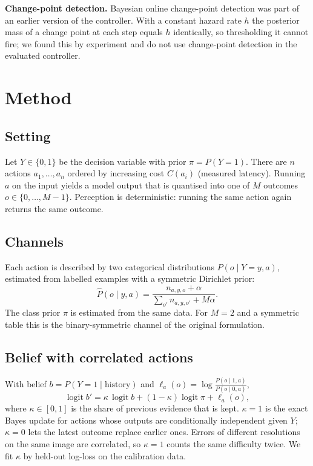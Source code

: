 \documentclass[11pt]{article}
\begin{document}
\textbf{Change-point detection.} Bayesian online change-point detection \cite{adams2007bayesian}
was part of an earlier version of the controller. With a constant hazard rate $h$ the posterior
mass of a change point at each step equals $h$ identically, so thresholding it cannot fire; we
found this by experiment and do not use change-point detection in the evaluated controller.

\section{Method}
\label{sec:method}

\subsection{Setting}
Let $Y\in\{0,1\}$ be the decision variable with prior $\pi=P(Y{=}1)$. There are $n$ actions
$a_1,\dots,a_n$ ordered by increasing cost $C(a_i)$ (measured latency). Running $a$ on the input
yields a model output that is quantised into one of $M$ outcomes $o\in\{0,\dots,M{-}1\}$. Perception
is deterministic: running the same action again returns the same outcome.

\subsection{Channels}
Each action is described by two categorical distributions $P(o\mid Y{=}y,a)$, estimated from
labelled examples with a symmetric Dirichlet prior:
\begin{equation}
  \hat P(o\mid y,a)=\frac{n_{a,y,o}+\alpha}{\sum_{o'}n_{a,y,o'}+M\alpha}.
\end{equation}
The class prior $\pi$ is estimated from the same data. For $M=2$ and a symmetric table this is the
binary-symmetric channel of the original formulation.

\subsection{Belief with correlated actions}
With belief $b=P(Y{=}1\mid\text{history})$ and $\ell_a(o)=\log\frac{P(o\mid 1,a)}{P(o\mid 0,a)}$,
\begin{equation}
  \operatorname{logit} b' = \kappa\,\operatorname{logit} b + (1-\kappa)\operatorname{logit}\pi + \ell_a(o),
  \label{eq:update}
\end{equation}
where $\kappa\in[0,1]$ is the share of previous evidence that is kept. $\kappa{=}1$ is the exact
Bayes update for actions whose outputs are conditionally independent given $Y$; $\kappa{=}0$ lets
the latest outcome replace earlier ones. Errors of different resolutions on the same image are
correlated, so $\kappa{=}1$ counts the same difficulty twice. We fit $\kappa$ by held-out
log-loss on the calibration data.
\end{document}
